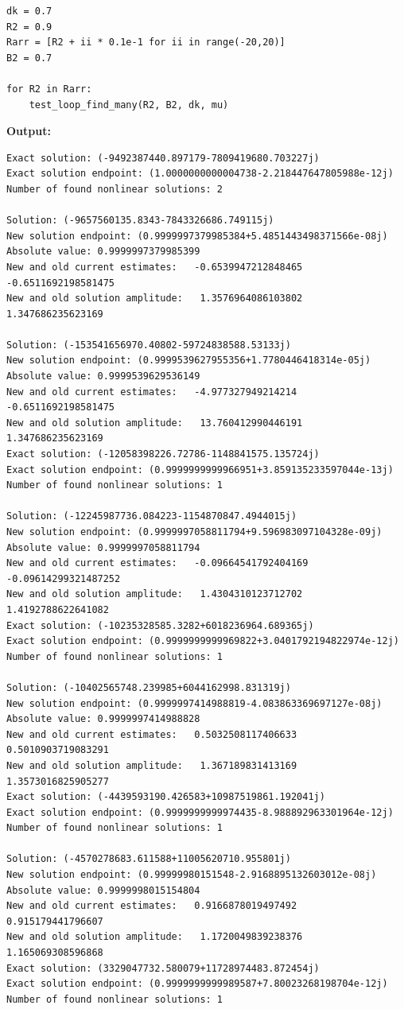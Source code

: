 \documentclass{article}
\begin{document}
\begin{lstlisting}
dk = 0.7
R2 = 0.9
Rarr = [R2 + ii * 0.1e-1 for ii in range(-20,20)]
B2 = 0.7

for R2 in Rarr:
    test_loop_find_many(R2, B2, dk, mu)\end{lstlisting}

\textbf{Output:}\begin{verbatim}
Exact solution: (-9492387440.897179-7809419680.703227j)
Exact solution endpoint: (1.0000000000004738-2.218447647805988e-12j)
Number of found nonlinear solutions: 2

Solution: (-9657560135.8343-7843326686.749115j)
New solution endpoint: (0.9999997379985384+5.4851443498371566e-08j) Absolute value: 0.9999997379985399
New and old current estimates:   -0.6539947212848465    -0.6511692198581475
New and old solution amplitude:   1.3576964086103802    1.347686235623169

Solution: (-153541656970.40802-59724838588.53133j)
New solution endpoint: (0.9999539627955356+1.7780446418314e-05j) Absolute value: 0.9999539629536149
New and old current estimates:   -4.977327949214214    -0.6511692198581475
New and old solution amplitude:   13.760412990446191    1.347686235623169
Exact solution: (-12058398226.72786-1148841575.135724j)
Exact solution endpoint: (0.9999999999966951+3.859135233597044e-13j)
Number of found nonlinear solutions: 1

Solution: (-12245987736.084223-1154870847.4944015j)
New solution endpoint: (0.9999997058811794+9.596983097104328e-09j) Absolute value: 0.9999997058811794
New and old current estimates:   -0.09664541792404169    -0.09614299321487252
New and old solution amplitude:   1.4304310123712702    1.4192788622641082
Exact solution: (-10235328585.3282+6018236964.689365j)
Exact solution endpoint: (0.9999999999969822+3.0401792194822974e-12j)
Number of found nonlinear solutions: 1

Solution: (-10402565748.239985+6044162998.831319j)
New solution endpoint: (0.9999997414988819-4.083863369697127e-08j) Absolute value: 0.9999997414988828
New and old current estimates:   0.5032508117406633    0.5010903719083291
New and old solution amplitude:   1.367189831413169    1.3573016825905277
Exact solution: (-4439593190.426583+10987519861.192041j)
Exact solution endpoint: (0.9999999999974435-8.988892963301964e-12j)
Number of found nonlinear solutions: 1

Solution: (-4570278683.611588+11005620710.955801j)
New solution endpoint: (0.99999980151548-2.9168895132603012e-08j) Absolute value: 0.9999998015154804
New and old current estimates:   0.9166878019497492    0.915179441796607
New and old solution amplitude:   1.1720049839238376    1.165069308596868
Exact solution: (3329047732.580079+11728974483.872454j)
Exact solution endpoint: (0.9999999999989587+7.80023268198704e-12j)
Number of found nonlinear solutions: 1


\end{verbatim}
\end{document}
